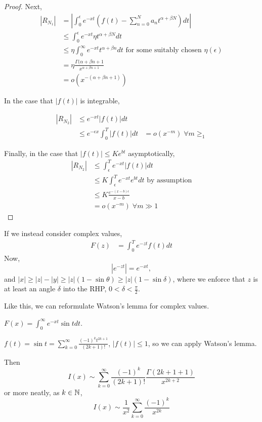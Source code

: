 \documentclass[a4paper]{article}
\begin{document}
\begin{proof}
	Next,
	\begin{align*}
		|R_{N_1}| &= \left|\int_{0}^{\epsilon}e^{-xt} \left( f(t) - \sum_{n=0}^{N} a_n t^{\alpha + \beta N} \right) dt \right| \\
		&\le \int_0^{\epsilon} e^{-xt} \eta t^{\alpha + \beta N} dt \\
		&\le \eta \int_0^{\infty} e^{-xt} t^{\alpha + \beta n}dt \text{ for some suitably chosen $\eta(\epsilon)$}\\
		&= \eta \frac{\Gamma(\alpha + \beta n + 1}{x^{\alpha + \beta n + 1}} \\
		&= o\left( x^{-(\alpha + \beta n + 1)} \right) 
	\end{align*} 

	In the case that $|f(t)|$ is integrable,

	\begin{align*}
		|R_{N_2}| &\le e^{-xt} |f(t)| dt \\
			&\le  e^{-\epsilon x} \int_{0}^{T}|f(t)| dt
			&= o(x^{-m}) \; \forall m \ge_1
	\end{align*}

	Finally, in the case that $|f(t)| \le  Ke^{bt}$ asymptotically,
	\begin{align*}
		|R_{N_2}| &\le \int_{\epsilon}^{T} e^{-xt} |f(t)| dt \\
		&\le K \int_{\epsilon}^{T} e^{-xt}e^{bt} dt \text{ by assumption} \\
		&\le K \frac{e^{-(x-b)\epsilon}}{x-b} \\
		&= o(x^{-m}) \; \forall m \gg 1
	\end{align*}
\end{proof}

If we instead consider complex values,
\begin{align*}
	F(z) &= \int_0^{T} e^{-zt} f(t) dt
\end{align*}
Now, \[
|e^{-zt}| = e^{-xt}
,\]
and $|x|\ge |z| - |y| \ge |z|(1-\sin \theta) \ge |z|(1 - \sin\delta)$, where we enforce that $z$ is at least an angle $\delta$ into the RHP, $0<\delta<\frac{\pi}{2}$.

Like this, we can reformulate Watson's lemma for complex values.

\begin{eg}
	$F(x) = \int_{0}^{\infty} e^{-xt} \sin t dt$.

	$f(t) = \sin t = \sum_{k=0}^{\infty} \frac{(-1)^{k}t^{2k+1}}{(2k+1)!}$, $|f(t)| \le 1$, so we can apply Watson's lemma.

	Then \[
		I(x) \sim  \sum_{k=0}^{\infty} \frac{(-1)^{k}}{(2k+1)!} \frac{\Gamma(2k+1 + 1)}{x^{2k+2}}
	\]
	or more neatly, as $k \in \mathbb{N}$,
	\[
		I(x) \sim \frac{1}{x^2} \sum_{k=0}^{\infty} \frac{(-1)^{k}}{x^{2k}}
	\] 
\end{eg}
\end{document}
